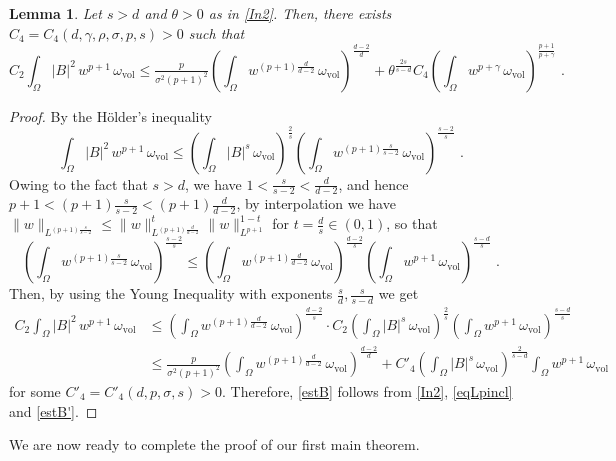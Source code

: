 \documentclass[10pt, a4paper, reqno, oneside]{amsart}
\theoremstyle{plain}
\theoremstyle{definition}
\theoremstyle{plain}
\newtheorem{lemma}[theo]{Lemma}
\theoremstyle{definition}
\theoremstyle{plain}
\renewcommand{\=}{:=}
\begin{document}
\begin{lemma}
Let $s>d$ and $\theta>0$ as in \eqref{In2}. Then, there exists $C_4=C_4(d,\gamma,\rho,\sigma,p,s)>0$ such that
\begin{equation} \label{estB}
C_2\int_\Omega |B|^2\,w^{p+1}\,\omega_{\mathrm{vol}}
\leq
\tfrac{p}{\sigma^2(p+1)^2}\left(\int_\Omega w^{(p+1)\frac{d}{d-2}}\,\omega_{\mathrm{vol}}\right)^{\frac{d-2}d} +\theta^{\frac{2s}{s-d}}C_4 \left(\int_\Omega w^{p+\gamma}\,\omega_{\mathrm{vol}}\right)^{\frac{p+1}{p+\gamma}} \,\, .
\end{equation}
\end{lemma}
\begin{proof}
By the H\"older's inequality
$$
\int_\Omega |B|^2\,w^{p+1}\,\omega_{\mathrm{vol}} \leq \left(\int_\Omega |B|^s\,\omega_{\mathrm{vol}}\right)^{\frac2s} \left(\int_\Omega w^{(p+1)\frac{s}{s-2}}\,\omega_{\mathrm{vol}}\right)^{\frac{s-2}s} \,\, .
$$
Owing to the fact that $s>d$, we have $1 < \tfrac{s}{s-2} < \tfrac{d}{d-2}$, and hence $p+1< (p+1)\tfrac{s}{s-2}<(p+1)\tfrac{d}{d-2}$, by interpolation we have $\|w\|_{L^{(p+1)\frac{s}{s-2}}}\leq \|w\|_{L^{(p+1)\frac{d}{d-2}}}^{t} \|w\|_{L^{p+1}}^{1-t}$ for $t=\frac{d}{s}\in(0,1)$, so that
$$
\left(\int_\Omega w^{(p+1)\frac{s}{s-2}}\,\omega_{\mathrm{vol}}\right)^{\frac{s-2}s} \leq \left(\int_\Omega w^{(p+1)\frac{d}{d-2}}\,\omega_{\mathrm{vol}}\right)^{\frac{d-2}s} \left(\int_\Omega w^{p+1}\,\omega_{\mathrm{vol}}\right)^{\frac{s-d}s} \,\, .
$$
Then, by using the Young Inequality with exponents $\tfrac{s}{d}, \tfrac{s}{s-d}$ we get
\begin{align}
C_2\int_\Omega |B|^2\,w^{p+1}\,\omega_{\mathrm{vol}}
&\leq 
\left(\int_\Omega w^{(p+1)\frac{d}{d-2}}\,\omega_{\mathrm{vol}}\right)^{\frac{d-2}s}
\cdot C_2
\left(\int_\Omega |B|^s\,\omega_{\mathrm{vol}}\right)^{\frac2s}
\left(\int_\Omega w^{p+1}\,\omega_{\mathrm{vol}}\right)^{\frac{s-d}s} \nonumber\\
%
& \label{estB'}
\leq
\tfrac{p}{\sigma^2(p+1)^2}\left(\int_\Omega w^{(p+1)\frac{d}{d-2}}\,\omega_{\mathrm{vol}}\right)^{\frac{d-2}d} +C'_4
\left(\int_\Omega |B|^s\,\omega_{\mathrm{vol}}\right)^{\frac2{s-d}}
\int_\Omega w^{p+1}\,\omega_{\mathrm{vol}}
\end{align}
for some $C'_4=C'_4(d,p,\sigma,s)>0$. Therefore, \eqref{estB} follows from \eqref{In2}, \eqref{eqLpincl} and \eqref{estB'}.
\end{proof}

We are now ready to complete the proof of our first main theorem.
\end{document}
